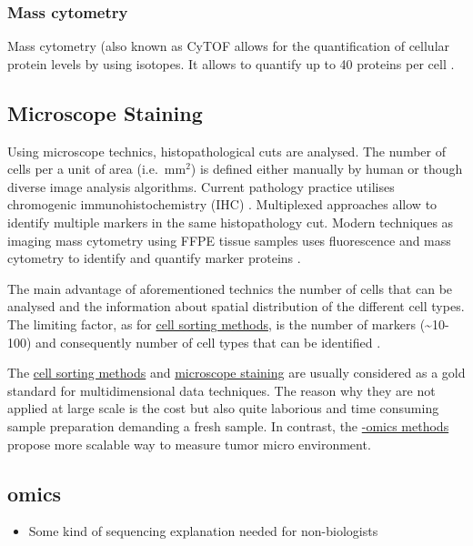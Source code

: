 \documentclass[12pt,]{book}
\providecommand{\tightlist}{%
  \setlength{\itemsep}{0pt}\setlength{\parskip}{0pt}}
\theoremstyle{definition}
\theoremstyle{definition}
\theoremstyle{definition}
\theoremstyle{remark}
\begin{document}
\hypertarget{mass-cytometry}{%
\subsubsection{Mass cytometry}\label{mass-cytometry}}

Mass cytometry (also known as CyTOF allows for the quantification of
cellular protein levels by using isotopes. It allows to quantify up to
40 proteins per cell \citep{Papalexi2017}.

\hypertarget{staining}{%
\subsection{Microscope Staining}\label{staining}}

Using microscope technics, histopathological cuts are analysed. The
number of cells per a unit of area (i.e.~mm\(^2\)) is defined either
manually by human or though diverse image analysis algorithms. Current
pathology practice utilises chromogenic immunohistochemistry (IHC)
\citep{RamosVara2010}. Multiplexed approaches allow to identify multiple
markers in the same histopathology cut. Modern techniques as imaging
mass cytometry using FFPE tissue samples uses fluorescence and mass
cytometry to identify and quantify marker proteins \citep{Giesen2014}.

The main advantage of aforementioned technics the number of cells that
can be analysed and the information about spatial distribution of the
different cell types. The limiting factor, as for
\protect\hyperlink{facs}{cell sorting methods}, is the number of markers
(\textasciitilde{}10-100) and consequently number of cell types that can
be identified \citep{Schelker2017}.

The \protect\hyperlink{facs}{cell sorting methods} and
\protect\hyperlink{staining}{microscope staining} are usually considered
as a gold standard for multidimensional data techniques. The reason why
they are not applied at large scale is the cost but also quite laborious
and time consuming sample preparation demanding a fresh sample. In
contrast, the \protect\hyperlink{omics}{-omics methods} propose more
scalable way to measure tumor micro environment.

\hypertarget{omics}{%
\subsection{omics}\label{omics}}

\begin{itemize}
\tightlist
\item
  Some kind of sequencing explanation needed for non-biologists
\end{itemize}
\end{document}
